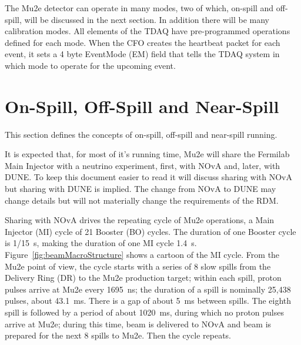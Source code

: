 The Mu2e detector can operate in many modes, two of which,
on-spill and off-spill, will be discussed in the next section.
In addition there will be many calibration modes.
All elements of the TDAQ have pre-programmed operations defined for each mode.
When the CFO creates the heartbeat packet for each event,
it sets a 4 byte EventMode (EM) field
that tells the TDAQ system in which mode to operate for the upcoming event.

\section{On-Spill, Off-Spill and Near-Spill}

This section defines the concepts of on-spill, off-spill and near-spill running.

It is expected that, for most of it's running time,
Mu2e will share the Fermilab Main Injector with a neutrino experiment,
first, with NOvA and, later, with DUNE.
To keep this document easier to read it will discuss sharing with NOvA but sharing with DUNE is implied.
The change from NOvA to DUNE may change details
but will not materially change the requirements of the RDM.

Sharing with NOvA drives the repeating cycle of Mu2e operations, a Main Injector (MI) cycle of
21 Booster (BO) cycles.
The duration of one Booster cycle is 1/15~s,
making the duration of one MI cycle 1.4~s.
Figure~\ref{fig:beamMacroStructure} shows a cartoon of the MI cycle.
From the Mu2e point of view, the cycle starts with a series of 8 slow spills
from the Delivery Ring (DR) to the Mu2e production target;
within each spill, proton pulses arrive at Mu2e every 1695~ns;
the duration of a spill is nominally 25,438 pulses, about 43.1~ms.
There is a gap of about 5~ms between spills.
The eighth spill is followed by a period of about 1020~ms,
during which no proton pulses arrive at Mu2e;
during this time, beam is delivered to NOvA
and beam is prepared for the next 8 spills to Mu2e.
Then the cycle repeats.

